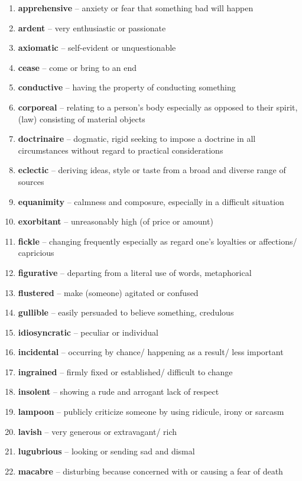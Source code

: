 \begin{enumerate}[wide,labelindent=0pt]
\item \textbf{apprehensive} -- anxiety or fear that something bad will happen
\item \textbf{ardent} -- very enthusiastic or passionate
\item \textbf{axiomatic} -- self-evident or unquestionable
\item \textbf{cease} -- come or bring to an end
\item \textbf{conductive} -- having the property of conducting something
\item \textbf{corporeal} -- relating to a person's body especially as opposed to their spirit, (law) consisting of material objects
\item \textbf{doctrinaire} -- dogmatic, rigid seeking to impose a doctrine in all circumstances without regard to practical considerations
\item \textbf{eclectic} -- deriving ideas, style or taste from a broad and diverse range of sources
\item \textbf{equanimity} -- calmness and composure, especially in a difficult situation
\item \textbf{exorbitant} -- unreasonably high (of price or amount)
\item \textbf{fickle} -- changing frequently especially as regard one's loyalties or affections/ capricious
\item \textbf{figurative} -- departing from a literal use of words, metaphorical
\item \textbf{flustered} -- make (someone) agitated or confused
\item \textbf{gullible} -- easily persuaded to believe something, credulous
\item \textbf{idiosyncratic} -- peculiar or individual
\item \textbf{incidental} -- occurring by chance/ happening as a result/ less important
\item \textbf{ingrained} -- firmly fixed or established/ difficult to change
\item \textbf{insolent} -- showing a rude and arrogant lack of respect
\item \textbf{lampoon} -- publicly criticize someone by using ridicule, irony or sarcasm
\item \textbf{lavish} -- very generous or extravagant/ rich
\item \textbf{lugubrious} -- looking or sending sad and dismal
\item \textbf{macabre} -- disturbing because concerned with or causing a fear of death

\end{enumerate}
